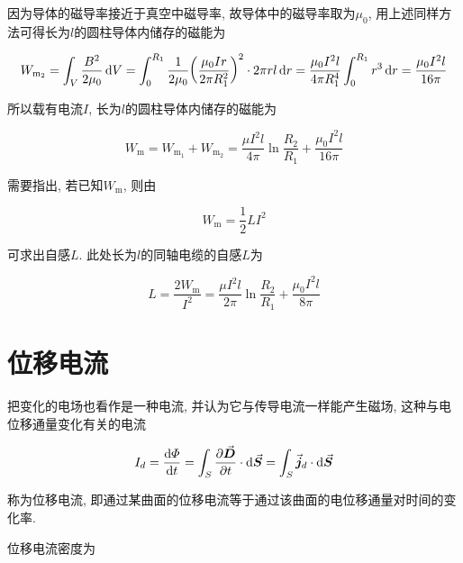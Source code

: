 \begin{example}
\begin{solution}
		因为导体的磁导率接近于真空中磁导率, 故导体中的磁导率取为$\mu_0$, 用上述同样方法可得长为$l$的圆柱导体内储存的磁能为
		
		\begin{equation*}
			W_{\textrm{m}_2} = \int_{V} \dfrac{B^2}{2 \mu_0} \dd{V} = \int_{0}^{R_1} \dfrac{1}{2\mu_0} \qty(\dfrac{\mu_0 I r}{2 \pi R_1^2})^2 \cdot 2 \pi r l \dd{r} = \dfrac{\mu_0 I^2 l}{4 \pi R_1^4} \int_{0}^{R_1} r^3 \dd{r} = \dfrac{\mu_0 I^2 l}{16 \pi}
		\end{equation*}
		
		所以载有电流$I$, 长为$l$的圆柱导体内储存的磁能为
		
		\begin{equation*}
			W_{\textrm{m}} = W_{\textrm{m}_1} + W_{\textrm{m}_2} = \dfrac{\mu I^2 l}{4 \pi} \ln \dfrac{R_2}{R_1} + \dfrac{\mu_0 I^2 l}{16 \pi}
		\end{equation*}
		
		需要指出, 若已知$W_{\textrm{m}}$, 则由
		
		\begin{equation*}
			W_{\textrm{m}} = \dfrac{1}{2} L I^2
		\end{equation*}
		
		可求出自感$L$. 此处长为$l$的同轴电缆的自感$L$为
		
		\begin{equation*}
			L = \dfrac{2 W_{\textrm{m}}}{I^2} = \dfrac{\mu I^2 l}{2 \pi} \ln \dfrac{R_2}{R_1} + \dfrac{\mu_0 I^2 l}{8 \pi}
		\end{equation*}
		
	\end{solution}
	
\end{example}

\section{位移电流}\label{9.5}

把变化的电场也看作是一种电流, 并认为它与传导电流一样能产生磁场, 这种与电位移通量变化有关的电流

\begin{equation}
	I_d = \dv{\varPhi}{t} = \int_{S} \pdv{\va*{D}}{t} \cdot \dd{\va*{S}} = \int_{S} \va*{j}_d \cdot \dd{\va*{S}} \label{C9-eq20}
\end{equation}

称为位移电流, 即通过某曲面的位移电流等于通过该曲面的电位移通量对时间的变化率. 

位移电流密度为

